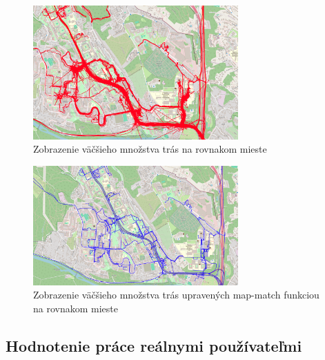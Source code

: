 \begin{figure}[H]
  \centering
  \includegraphics[width=0.7\textwidth]{img/map-match rozdiel/pred map-match.png}
  \caption{Zobrazenie väčšieho množstva trás na rovnakom mieste}
  \label{fig:spagety}
\end{figure}
\begin{figure}[H]
  \centering
  \includegraphics[width=0.7\textwidth]{img/map-match rozdiel/po map-match.png}
  \caption{Zobrazenie väčšieho množstva trás upravených map-match funkciou na rovnakom mieste}
  \label{fig:niespagety}
\end{figure}

\pagebreak
\subsection{Hodnotenie práce reálnymi používateľmi}

